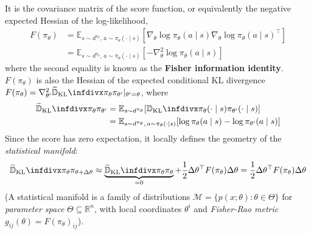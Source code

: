 \documentclass[11pt, letterpaper]{article}
\begin{document}
\begin{concept}
    It is the covariance matrix of the score function, or equivalently the negative expected Hessian of the log-likelihood, 
    \begin{align*}
        F(\pi_\theta) 
        &= \mathbb{E}_{s \sim d^{\pi_\theta},\, a \sim \pi_\theta(\cdot \mid s)} \left[\nabla_\theta \log \pi_\theta(a \mid s) \nabla_\theta \log \pi_\theta(a \mid s)^\top \right] \\
        &= \mathbb{E}_{s \sim d^{\pi_\theta},\, a \sim \pi_\theta(\cdot \mid s)} \left[-\nabla_\theta^2 \log \pi_\theta(a \mid s)\right]
    \end{align*}
    where the second equality is known as the \textbf{Fisher information identity}. \(F(\pi_\theta)\) is also the Hessian of the expected conditional KL divergence \(F(\pi_\theta) = \nabla_{\theta'}^2 \TKL{\pi_\theta}{\pi_{\theta'}} \rvert_{\theta' = \theta}\), where
    \begin{align*}
        \TKL{\pi_\theta}{\pi_{\theta'}} 
        &= \mathbb{E}_{s \sim d^{\pi_\theta}}[\KL{\pi_\theta(\cdot \mid s)}{\pi_{\theta'}(\cdot \mid s)} ] \\
        &= \mathbb{E}_{s \sim d^{\pi_\theta},\, a \sim \pi_\theta(\cdot \mid s)} [\log \pi_\theta(a \mid s) - \log \pi_{\theta'}(a \mid s)]
    \end{align*}
    Since the score has zero expectation, it locally defines the geometry of the \textit{statistical manifold}: 
    \[
        \TKL{\pi_\theta}{\pi_{\theta + \Delta\theta}} 
        \approx \underbrace{\TKL{\pi_\theta}{\pi_{\theta}}}_{=0} + \frac{1}{2}\Delta\theta^\top F(\pi_\theta) \Delta\theta
        = \frac{1}{2}\Delta\theta^\top F(\pi_\theta) \Delta\theta
    \]
    (A statistical manifold is a family of distributions \(\mathcal{M} = \{p(x; \theta) : \theta \in \Theta \}\) for \textit{parameter space} \(\Theta \subseteq \mathbb{R}^n\), with local coordinates \(\theta^i\) and \textit{Fisher-Rao metric} \(g_{ij}(\theta) = F(\pi_\theta)_{ij}\)). 
\end{concept}
\end{document}
